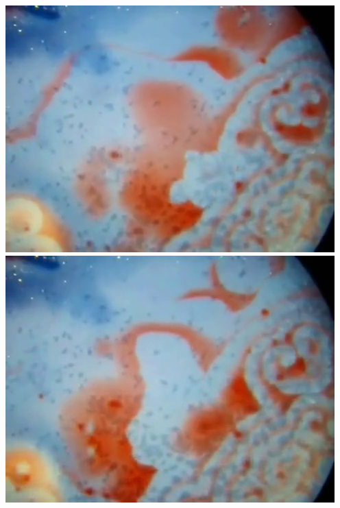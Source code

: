 \documentclass[12pt]{report}
\begin{document}
{\includegraphics[scale=0.25]{BZ-frames0021.png}
\includegraphics[scale=0.25]{BZ-frames0022.png}

}
\end{document}
